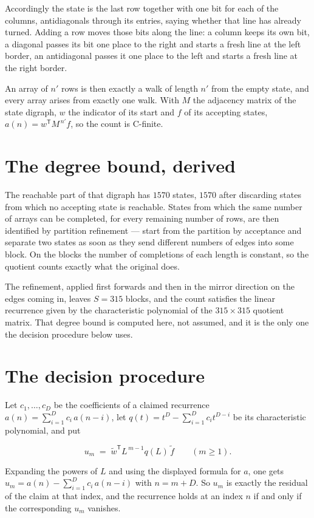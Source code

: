 \documentclass[11pt]{article}
\theoremstyle{definition}
\begin{document}
Accordingly the state is the last row together with one bit for each of the columns, antidiagonals through its entries, saying whether that line has already turned. Adding a row moves those bits along the line: a column keeps its own bit, a diagonal passes its bit one place to the right and starts a fresh line at the left border, an antidiagonal passes it one place to the left and starts a fresh line at the right border.

An array of $n'$ rows is then exactly a walk of length $n'$ from the empty state, and every array arises from exactly one walk. With $M$ the adjacency matrix of the state digraph, $w$ the indicator of its start and $f$ of its accepting states, $a(n) = w^{\mathsf T}M^{\,n'}f$, so the count is C-finite.

\section{The degree bound, derived}

The reachable part of that digraph has $1570$ states, $1570$ after discarding states from which no accepting state is reachable. States from which the same number of arrays can be completed, for every remaining number of rows, are then identified by partition refinement --- start from the partition by acceptance and separate two states as soon as they send different numbers of edges into some block. On the blocks the number of completions of each length is constant, so the quotient counts exactly what the original does.

The refinement, applied first forwards and then in the mirror direction on the edges coming in, leaves $S = 315$ blocks, and the count satisfies the linear recurrence given by the characteristic polynomial of the $315 \times 315$ quotient matrix. That degree bound is computed here, not assumed, and it is the only one the decision procedure below uses.

\section{The decision procedure}

Let $c_1,\dots,c_D$ be the coefficients of a claimed recurrence $a(n) = \sum_{i=1}^{D} c_i\,a(n-i)$, let $q(t) = t^{D} - \sum_{i=1}^{D} c_i t^{D-i}$ be its characteristic polynomial, and put

\[u_m \;=\; \tilde w^{\mathsf T} L^{\,m-1} q(L)\,\tilde f \qquad (m \ge 1).\]

Expanding the powers of $L$ and using the displayed formula for $a$, one gets $u_m = a(n) - \sum_{i=1}^{D} c_i\,a(n-i)$ with $n = m + D$. So $u_m$ is exactly the residual of the claim at that index, and the recurrence holds at an index $n$ if and only if the corresponding $u_m$ vanishes.
\end{document}

